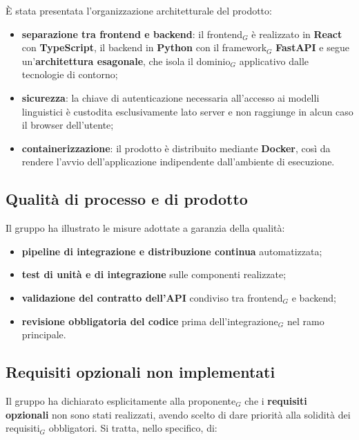 \documentclass[a4paper, 10pt, colorlinks=true, linkcolor=black, urlcolor=blue, citecolor=blue, hidelinks]{article}
\begin{document}
È stata presentata l'organizzazione architetturale del prodotto:

\begin{itemize}
    \item \textbf{separazione tra frontend e backend}: il frontend$_G$ è realizzato in \textbf{React} con \textbf{TypeScript}, il backend in \textbf{Python} con il framework$_G$ \textbf{FastAPI} e segue un'\textbf{architettura esagonale}, che isola il dominio$_G$ applicativo dalle tecnologie di contorno;
    \item \textbf{sicurezza}: la chiave di autenticazione necessaria all'accesso ai modelli linguistici è custodita esclusivamente lato server e non raggiunge in alcun caso il browser dell'utente;
    \item \textbf{containerizzazione}: il prodotto è distribuito mediante \textbf{Docker}, così da rendere l'avvio dell'applicazione indipendente dall'ambiente di esecuzione.
\end{itemize}

\subsection{Qualità di processo e di prodotto}

Il gruppo ha illustrato le misure adottate a garanzia della qualità:

\begin{itemize}
    \item \textbf{pipeline di integrazione e distribuzione continua} automatizzata;
    \item \textbf{test di unità e di integrazione} sulle componenti realizzate;
    \item \textbf{validazione del contratto dell'API} condiviso tra frontend$_G$ e backend;
    \item \textbf{revisione obbligatoria del codice} prima dell'integrazione$_G$ nel ramo principale.
\end{itemize}

\subsection{Requisiti opzionali non implementati}

Il gruppo ha dichiarato esplicitamente alla proponente$_G$ che i \textbf{requisiti opzionali} non sono stati realizzati, avendo scelto di dare priorità alla solidità dei requisiti$_G$ obbligatori. Si tratta, nello specifico, di:
\end{document}
